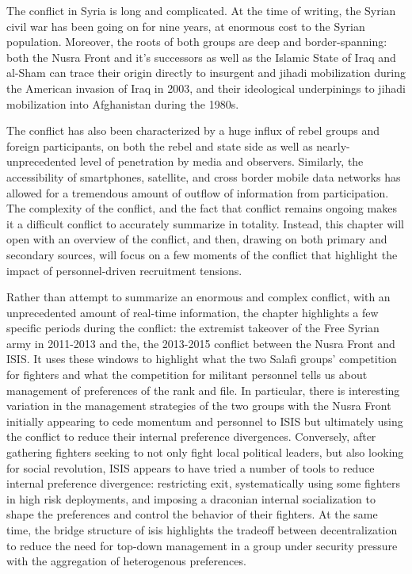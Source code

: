 The conflict in Syria is long and complicated. At the time of writing, the Syrian civil war has been going on for nine years, at enormous cost to the Syrian population. Moreover, the roots of both groups are deep and border-spanning:  both the Nusra Front and it’s successors as well as the Islamic State of Iraq and al-Sham can trace their origin directly to insurgent and jihadi mobilization during the American invasion of Iraq in 2003, and their ideological underpinings to jihadi mobilization into Afghanistan during the 1980s. 

 The conflict has also been  characterized by a huge influx of rebel groups and foreign participants, on both the rebel and state side as well as nearly-unprecedented level of penetration by media and observers. Similarly, the accessibility of smartphones, satellite, and cross border mobile data networks  has allowed for a tremendous amount of outflow of information from participation. The complexity of the conflict, and the fact that conflict remains ongoing makes it a difficult conflict to accurately summarize in totality. Instead, this chapter will open with an overview of the conflict, and then, drawing on both primary and secondary sources, will focus on a few moments of the conflict that highlight the impact of personnel-driven recruitment tensions.  

Rather than attempt to summarize an enormous and complex conflict, with an unprecedented amount of real-time information, the chapter highlights a few specific periods during the conflict: the extremist takeover of the Free Syrian army in 2011-2013 and the, the 2013-2015 conflict between the Nusra Front and ISIS. It uses these windows to highlight what the two Salafi groups’ competition for fighters and what the competition for militant personnel tells us about management of preferences of the rank and file. In particular, there is interesting variation in the management strategies of the two groups with the Nusra Front initially appearing to cede momentum and personnel to ISIS but ultimately using the conflict to reduce their internal preference divergences. Conversely, after gathering fighters seeking to not only fight local political leaders, but also looking for social revolution, ISIS appears to have tried a number of tools to reduce internal preference divergence: restricting exit, systematically using some fighters in high risk deployments,  and imposing a draconian internal socialization to shape the preferences and control the behavior of their fighters. At the same time, the bridge structure of isis highlights the tradeoff between decentralization to reduce the need for top-down management in a group under security pressure with the aggregation of heterogenous preferences. 


